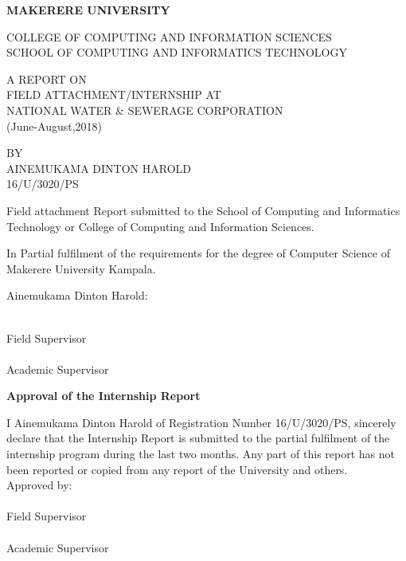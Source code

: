 \documentclass{article}
\begin{document}
\begin{titlepage}
\begin{center}
\textbf{MAKERERE UNIVERSITY}
\end{center}
COLLEGE OF COMPUTING AND INFORMATION SCIENCES\\
SCHOOL OF COMPUTING AND INFORMATICS TECHNOLOGY\\
\begin{center}
A REPORT ON\\FIELD ATTACHMENT/INTERNSHIP AT\\NATIONAL WATER \& SEWERAGE CORPORATION\\(June-August,2018)
\end{center}
\begin{center}
BY\\AINEMUKAMA DINTON HAROLD\\16/U/3020/PS
\end{center}
\hangindent 2cm Field attachment Report submitted to the School of Computing and Informatics Technology or College of Computing and Information Sciences.\\
\par In Partial fulfilment of the requirements for the degree of Computer Science of Makerere University Kampala.
\begin{center}
Ainemukama Dinton Harold:\dotfill
\end{center}
\makebox[2.5in]{\hrulefill} \hspace{0.3in}\makebox[2.5in]{\dotfill}\\
Field Supervisor \hspace{1.5in} \\
\vspace{.1in}
\makebox[2.5in]{\hrulefill} \hspace{0.3in}\makebox[2.5in]{\dotfill}\\
Academic Supervisor  \hspace{1.5in} \\
\end{titlepage}
\thispagestyle{empty}
\newpage
\textbf{Approval of the Internship Report}
\par I Ainemukama Dinton Harold of Registration Number 16/U/3020/PS, sincerely declare that the Internship Report is submitted to the partial fulfilment of the internship program during the last two months. Any part of this report has not been reported or copied from any report of the University and others.\\
Approved by:\\
\makebox[2.5in]{\hrulefill} \hspace{0.3in}\makebox[2.5in]{\dotfill}\\
Field Supervisor \\
\vspace{.1in}
\makebox[2.5in]{\hrulefill} \hspace{0.3in}\makebox[2.5in]{\dotfill}\\
Academic Supervisor \\
\end{document}
